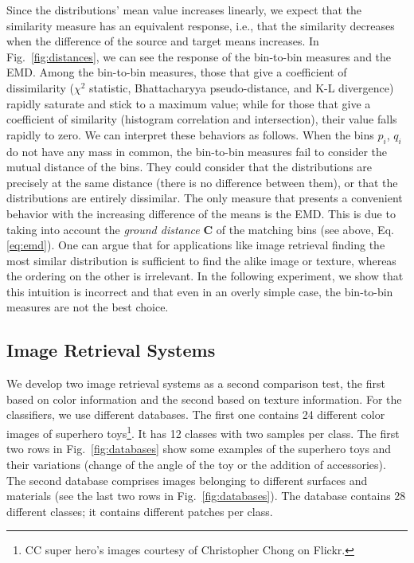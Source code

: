 Since the distributions' mean value increases linearly, we expect that the similarity measure has an equivalent response, i.e., that the similarity decreases when the difference of the source and target means increases. In Fig.\ \ref{fig:distances}, we can see the response of the bin-to-bin measures and the EMD. Among the bin-to-bin measures, those that give a coefficient of dissimilarity ($\chi^2$ statistic, Bhattacharyya pseudo-distance, and K-L divergence) rapidly saturate and stick to a maximum value; while for those that give a coefficient of similarity (histogram correlation and intersection), their value falls rapidly to zero. We can interpret these behaviors as follows. When the bins $p_i$, $q_i$ do not have any mass in common, the bin-to-bin measures fail to consider the mutual distance of the bins. They could consider that the distributions are precisely at the same distance (there is no difference between them), or that the distributions are entirely dissimilar. The only measure that presents a convenient behavior with the increasing difference of the means is the EMD. This is due to taking into account the \textit{ground distance} $\mathbf{C}$ of the matching bins (see above, Eq. \eqref{eq:emd}). One can argue that for applications like image retrieval finding the most similar distribution is sufficient to find the alike image or texture, whereas the ordering on the other is irrelevant. In the following experiment, we show that this intuition is incorrect and that even in an overly simple case, the bin-to-bin measures are not the best choice.
 
\subsection{Image Retrieval Systems}
We develop two image retrieval systems as a second comparison test, the first based on color information and the second based on texture information. For the classifiers, we use different databases. The first one contains 24 different color images of superhero toys\footnote{CC super hero's images courtesy of Christopher Chong on Flickr.}. It has 12 classes with two samples per class. The first two rows in Fig.\ \ref{fig:databases} show some examples of the superhero toys and their variations (change of the angle of the toy or the addition of accessories). The second database \citep{Kylberg:Dataset:2011} comprises images belonging to different surfaces and materials (see the last two rows in Fig.\ \ref{fig:databases}). The database contains 28 different classes; it contains different patches per class. 


